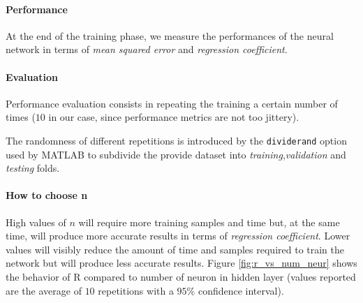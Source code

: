 \documentclass[twocolumn,a4paper]{article}
\begin{document}
\paragraph{Performance} At the end of the training phase, we measure the performances of the neural network in terms of \textit{mean squared error} and \textit{regression coefficient}. 
\paragraph{Evaluation} Performance evaluation consists in repeating the training a certain number of times ($10$ in our case, since performance metrics are not too jittery). 

The randomness of different repetitions is introduced by the \texttt{dividerand} option used by MATLAB to subdivide the provide dataset into \textit{training},\textit{validation} and \textit{testing} folds.
\paragraph{How to choose n} High values of $n$ will require more training samples and time but, at the same time, will produce more accurate results in terms of \textit{regression coefficient}.
Lower values will visibly reduce the amount of time and samples required to train the network but will produce less accurate results. Figure \ref{fig:r_vs_num_neur} shows the behavior of R compared to number of neuron in hidden layer (values reported are the average of $10$ repetitions with a $95\%$ confidence interval).
\end{document}
